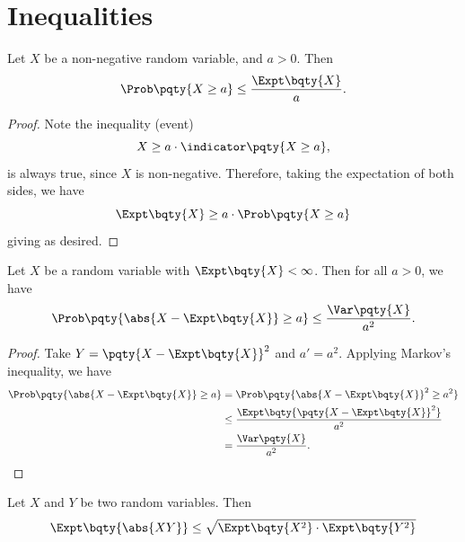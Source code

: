 \section{Inequalities}

\begin{theorem}
    \label{thm:markov-inequality}%
    Let \(X\) be a non-negative random variable, and \(a > 0\). Then
    \[
        \Prob\pqty{X \geq a} \leq \frac{\Expt\bqty{X}}{a}.
    \]
\end{theorem}

\begin{proof}
    Note the inequality (event)
    \[
        X \geq a \cdot \indicator\pqty{X \geq a},
    \]
    is always true, since \(X\) is non-negative. Therefore, taking the expectation of both sides, we have
    \[
        \Expt\bqty{X} \geq a \cdot \Prob\pqty{X \geq a}
    \]
    giving as desired.
\end{proof}

\begin{theorem}
    \label{thm:chebyshev-inequality}%
    Let \(X\) be a random variable with \(\Expt\bqty{X} < \infty\). Then for all \(a > 0\), we have
    \[
        \Prob\pqty{\abs{X - \Expt\bqty{X}} \geq a} \leq \frac{\Var\pqty{X}}{a^2}.
    \]
\end{theorem}

\begin{proof}
    Take \(Y = \pqty{X - \Expt\bqty{X}}^2\) and \(a' = a^2\). Applying Markov's inequality, we have
    \begin{align*}
        \Prob\pqty{\abs{X - \Expt\bqty{X}} \geq a} &= \Prob\pqty{\abs{X - \Expt\bqty{X}}^2 \geq a^2} \\
        &\leq \frac{\Expt\bqty{\pqty{X - \Expt\bqty{X}}^2}}{a^2} \\
        &= \frac{\Var\pqty{X}}{a^2}.
    \end{align*}
\end{proof}

\begin{theorem}
    \label{thm:cauchy-schwartz-inequality}%
    Let \(X\) and \(Y\) be two random variables. Then
    \[
        \Expt\bqty{\abs{XY}} \leq \sqrt{\Expt\bqty{X^2} \cdot \Expt\bqty{Y^2}}
    \]
\end{theorem}

